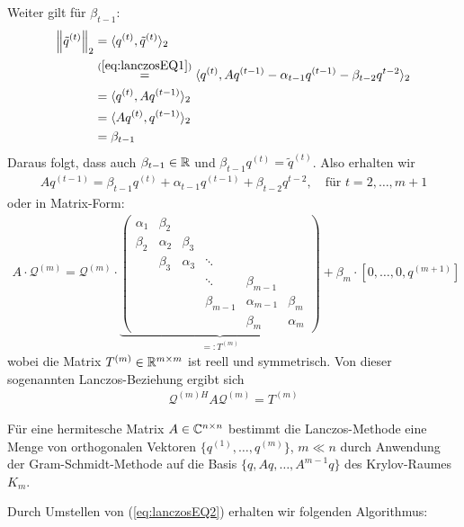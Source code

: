 Weiter gilt für $\beta_{t-1}$:
%
\begin{align*}
  \vertn{2}{\tilde{q}^{(t)}}_2 
  &= \langle q^{(t)}, \tilde{q}^{(t)}\rangle_2 \\
  &\stackrel{(\ref{eq:lanczosEQ1})}{=} \langle q^{(t)}, Aq^{(t-1)}-\alpha_{t-1}q^{(t-1)}-\beta_{t-2}q^{t-2}\rangle_2 \\
  &= \langle q^{(t)}, Aq^{(t-1)}\rangle_2 \\
  &= \langle Aq^{(t)}, q^{(t-1)}\rangle_2 \\
  &= \beta_{t-1}
\end{align*}
%
Daraus folgt, dass auch $\beta_{t-1}\in\mathbb R$ und $\beta_{t-1}q^{(t)} = \tilde{q}^{(t)}$. Also erhalten wir 
\begin{align*}
  Aq^{(t-1)} = \beta_{t-1}q^{(t)} + \alpha_{t-1}q^{(t-1)} + \beta_{t-2}q^{t-2},\quad\text{für } t=2,\dots,m+1
  \tag{2}\label{eq:lanczosEQ2}
\end{align*}
%
oder in Matrix-Form:
%
\begin{align*}A\cdot \mathcal{Q}^{(m)} = \mathcal{Q}^{(m)}\cdot\underbrace{
  \begin{pmatrix}
    \alpha_1 & \beta_2 & & & & \\
    \beta_2 & \alpha_2 & \beta_3 & & & \\
    & \beta_3 & \alpha_3 & \ddots & & \\
    & & & \ddots & \beta_{m-1} & \\
    & & & \beta_{m-1} & \alpha_{m-1} & \beta_m \\
    & & & & \beta_m & \alpha_m
  \end{pmatrix}}_{=:T^{(m)}} + \beta_m\cdot[0,\dots,0,q^{(m+1)}]
\end{align*}
%
wobei die Matrix $T^{(m)}\in\mathbb R^{m\times m}$ ist reell und symmetrisch. Von dieser sogenannten Lanczos-Beziehung
ergibt sich
%
\begin{align*}
  \mathcal{Q}^{(m)H} A \mathcal{Q}^{(m)} = T^{(m)}
\end{align*} 
%
\begin{defbox}
  Für eine hermitesche Matrix $A\in\mathbb C  ^{n\times n}$ bestimmt die Lanczos-Methode eine Menge von orthogonalen 
  Vektoren $\{q^{(1)},\dots,q^{(m)}\}$, $m\ll n$ durch Anwendung der Gram-Schmidt-Methode auf die Basis 
  $\{q,Aq,\dots,A^{m-1}q\}$ des Krylov-Raumes $K_m$.
\end{defbox}

Durch Umstellen von (\ref{eq:lanczosEQ2}) erhalten wir folgenden Algorithmus:

